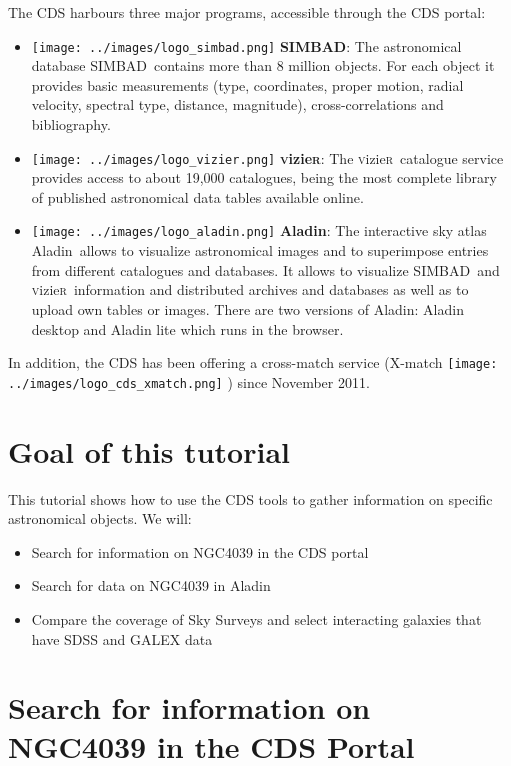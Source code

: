 \documentclass [a4paper, 12pt]{article}
\newcommand{\aladin}{{\textsc{A}{ladin}}}
\newcommand{\simbad}{{\textsc{SIMBAD}}}
\newcommand{\vizier}{{\textsc{v}izie\textsc{r}}}
\begin{document}
The CDS harbours three major programs, accessible through the CDS portal:\\
\begin{itemize}
\item \texttt{[image: ../images/logo\_simbad.png]} 
\textbf{\simbad}: The astronomical database \simbad\ contains more than 
8 million objects. For each object it provides basic measurements (type, 
coordinates, proper motion, radial velocity, spectral type, distance, 
magnitude), cross-correlations and bibliography.
\item \texttt{[image: ../images/logo\_vizier.png]}  
\textbf{\vizier}: The \vizier\ catalogue service provides access to about 
19,000 catalogues, being the most complete library of published astronomical 
data tables available online.
\item \texttt{[image: ../images/logo\_aladin.png]} 
\textbf{\aladin}: The interactive sky atlas \aladin\ allows to 
visualize astronomical images and to superimpose entries from different 
catalogues and databases. It allows to visualize \simbad\ and \vizier\ 
information and distributed archives and databases as well as to upload own 
tables or images. There are two versions of \aladin: Aladin desktop and Aladin 
lite which runs in the browser.
\end{itemize}

In addition, the CDS has been offering a cross-match service 
(X-match \texttt{[image: ../images/logo\_cds\_xmatch.png]} ) since November 2011. 

\section{Goal of this tutorial}

This tutorial shows how to use the CDS tools to gather information on 
specific astronomical objects. We will:
\begin{itemize}
\item Search for information on NGC4039 in the CDS portal
\item Search for data on NGC4039 in \aladin\
\item Compare the coverage of Sky Surveys and select interacting 
galaxies that have SDSS and GALEX data
\end{itemize}

\section{Search for information on NGC4039 in the CDS Portal}
\end{document}
